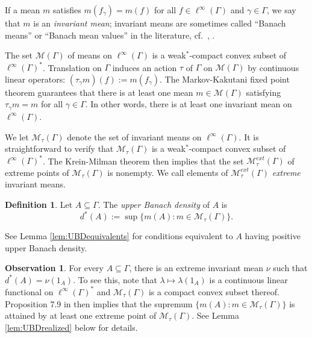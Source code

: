 \documentclass[12pt]{amsart} \usepackage{amsmath,centernot,amssymb,leftindex}
\numberwithin{theorem}{section}
\numberwithin{equation}{section}
\theoremstyle{definition}
\newtheorem{observation}[theorem]{Observation}
\newtheorem{definition}[theorem]{Definition}
\begin{document}
	If a mean $m$ satisfies
	$m(f_\gamma)=m(f)$ for all $f\in \ell^{\infty}(\Gamma)$ and $\gamma \in \Gamma$,	we say that $m$ is an \emph{invariant mean}; invariant means are sometimes called ``Banach means'' or ``Banach mean values'' in the literature, cf.~\cite{Folner_Generalization}, \cite{Folner_NoteOnGeneralization}.

	
The set $\mathcal M(\Gamma)$ of means on $\ell^{\infty}(\Gamma)$ is a weak$^{*}$-compact convex subset of $\ell^{\infty}(\Gamma)^{*}$. Translation on $\Gamma$ induces an action $\tau$ of $\Gamma$ on $\mathcal M(\Gamma)$ by continuous linear operators: $(\tau_{\gamma} m) (f):=m(f_{\gamma})$.  The Markov-Kakutani fixed point theorem \cite[p.~151]{Conway_FunctionalAnalysis} guarantees that there is at least one mean $m\in \mathcal M(\Gamma)$ satisfying $\tau_{\gamma}m=m$ for all $\gamma\in \Gamma$.  In other words, there is at least one invariant mean on $\ell^{\infty}(\Gamma)$. 

We let $\mathcal M_{\tau}(\Gamma)$ denote the set of invariant means on $\ell^\infty(\Gamma)$.   It is straightforward to verify that $\mathcal M_{\tau}(\Gamma)$ is a weak$^*$-compact convex subset of $\ell^\infty(\Gamma)^*$. The Krein-Milman theorem \cite[p.~142]{Conway_FunctionalAnalysis} then implies that the set $\mathcal M_{\tau}^{ext}(\Gamma)$ of extreme points of $\mathcal M_{\tau}(\Gamma)$ is nonempty.  We call  elements of $\mathcal M_{\tau}^{ext}(\Gamma)$ \emph{extreme} invariant means.
	

	
	
	
	\begin{definition}\label{def:UBD}
		Let $A\subseteq \Gamma$.  The \emph{upper Banach density} of $A$ is 
		\[d^*(A):=\sup\{m(A):m \in \mathcal M_{\tau}(\Gamma)\}.\]
	\end{definition}
See Lemma \ref{lem:UBDequivalents} for conditions equivalent to $A$ having positive upper Banach density.
	\begin{observation}\label{obs:UBDrealized} For every $A\subseteq \Gamma$, there is an extreme invariant mean $\nu$ such that $d^{*}(A)=\nu(1_{A})$. To see this, note that $\lambda \mapsto \lambda(1_{A})$ is a continuous linear functional on $\ell^{\infty}(\Gamma)^{*}$ and $\mathcal M_{\tau}(\Gamma)$ is a compact convex subset thereof. Proposition 7.9 in \cite[p.~144]{Conway_FunctionalAnalysis} then implies that the supremum $\{m(A):m\in \mathcal M_{\tau}(\Gamma)\}$ is attained by at least one extreme point of $\mathcal M_{\tau}(\Gamma)$. See Lemma \ref{lem:UBDrealized} below for details. 
	\end{observation}
\end{document}
